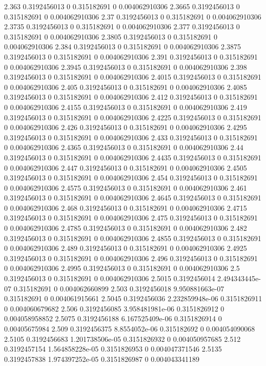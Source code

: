 {2.363 0.3192456013 0 0.315182691 0 0.004062910306
2.3665 0.3192456013 0 0.315182691 0 0.004062910306
2.37 0.3192456013 0 0.315182691 0 0.004062910306
2.3735 0.3192456013 0 0.315182691 0 0.004062910306
2.377 0.3192456013 0 0.315182691 0 0.004062910306
2.3805 0.3192456013 0 0.315182691 0 0.004062910306
2.384 0.3192456013 0 0.315182691 0 0.004062910306
2.3875 0.3192456013 0 0.315182691 0 0.004062910306
2.391 0.3192456013 0 0.315182691 0 0.004062910306
2.3945 0.3192456013 0 0.315182691 0 0.004062910306
2.398 0.3192456013 0 0.315182691 0 0.004062910306
2.4015 0.3192456013 0 0.315182691 0 0.004062910306
2.405 0.3192456013 0 0.315182691 0 0.004062910306
2.4085 0.3192456013 0 0.315182691 0 0.004062910306
2.412 0.3192456013 0 0.315182691 0 0.004062910306
2.4155 0.3192456013 0 0.315182691 0 0.004062910306
2.419 0.3192456013 0 0.315182691 0 0.004062910306
2.4225 0.3192456013 0 0.315182691 0 0.004062910306
2.426 0.3192456013 0 0.315182691 0 0.004062910306
2.4295 0.3192456013 0 0.315182691 0 0.004062910306
2.433 0.3192456013 0 0.315182691 0 0.004062910306
2.4365 0.3192456013 0 0.315182691 0 0.004062910306
2.44 0.3192456013 0 0.315182691 0 0.004062910306
2.4435 0.3192456013 0 0.315182691 0 0.004062910306
2.447 0.3192456013 0 0.315182691 0 0.004062910306
2.4505 0.3192456013 0 0.315182691 0 0.004062910306
2.454 0.3192456013 0 0.315182691 0 0.004062910306
2.4575 0.3192456013 0 0.315182691 0 0.004062910306
2.461 0.3192456013 0 0.315182691 0 0.004062910306
2.4645 0.3192456013 0 0.315182691 0 0.004062910306
2.468 0.3192456013 0 0.315182691 0 0.004062910306
2.4715 0.3192456013 0 0.315182691 0 0.004062910306
2.475 0.3192456013 0 0.315182691 0 0.004062910306
2.4785 0.3192456013 0 0.315182691 0 0.004062910306
2.482 0.3192456013 0 0.315182691 0 0.004062910306
2.4855 0.3192456013 0 0.315182691 0 0.004062910306
2.489 0.3192456013 0 0.315182691 0 0.004062910306
2.4925 0.3192456013 0 0.315182691 0 0.004062910306
2.496 0.3192456013 0 0.315182691 0 0.004062910306
2.4995 0.3192456013 0 0.315182691 0 0.004062910306
2.5 0.3192456013 0 0.315182691 0 0.004062910306
2.5015 0.3192456014 2.494343445e-07 0.315182691 0 0.004062660899
2.503 0.3192456018 9.950881663e-07 0.315182691 0 0.004061915661
2.5045 0.3192456036 2.232859948e-06 0.3151826911 0 0.004060679682
2.506 0.3192456085 3.958481981e-06 0.3151826912 0 0.004058958852
2.5075 0.3192456188 6.167525409e-06 0.3151826914 0 0.00405675984
2.509 0.3192456375 8.8554052e-06 0.315182692 0 0.004054090068
2.5105 0.3192456683 1.201738506e-05 0.3151826932 0 0.004050957685
2.512 0.3192457154 1.564858228e-05 0.3151826953 0 0.004047371546
2.5135 0.3192457838 1.974397252e-05 0.3151826987 0 0.004043341189
}

